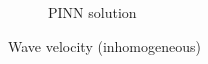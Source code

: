 \begin{frame}
\begin{figure}
\begin{subfigure}[b]{0.45\textwidth}
            \caption{PINN solution}
            \label{fig:16_inhomogeneous_pinn_swe_velocity}
        \end{subfigure}
        \caption{Wave velocity (inhomogeneous)}
        \label{fig:16_inhomogeneous_wave_velocity}
    \end{figure}
\end{frame}